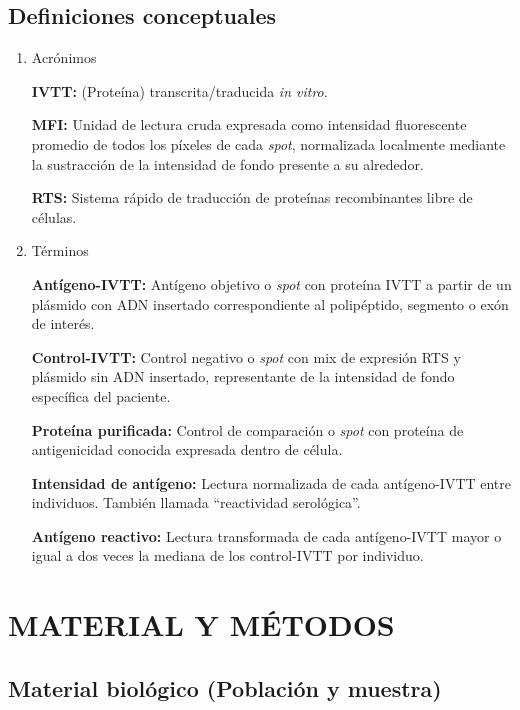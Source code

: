 \documentclass[
  a4paper]{article}
\begin{document}
\hypertarget{definiciones-conceptuales}{%
\subsection{Definiciones conceptuales}\label{definiciones-conceptuales}}

\begin{enumerate}
\def\labelenumi{\alph{enumi}.}
\item
  Acrónimos

  \textbf{IVTT:} (Proteína) transcrita/traducida \emph{in vitro}.

  \textbf{MFI:} Unidad de lectura cruda expresada como intensidad
  fluorescente promedio de todos los píxeles de cada \emph{spot},
  normalizada localmente mediante la sustracción de la intensidad de
  fondo presente a su alrededor.

  \textbf{RTS:} Sistema rápido de traducción de proteínas recombinantes
  libre de células.
\item
  Términos

  \textbf{Antígeno-IVTT:} Antígeno objetivo o \emph{spot} con proteína
  IVTT a partir de un plásmido con ADN insertado correspondiente al
  polipéptido, segmento o exón de interés.

  \textbf{Control-IVTT:} Control negativo o \emph{spot} con mix de
  expresión RTS y plásmido sin ADN insertado, representante de la
  intensidad de fondo específica del paciente.

  \textbf{Proteína purificada:} Control de comparación o \emph{spot} con
  proteína de antigenicidad conocida expresada dentro de célula.

  \textbf{Intensidad de antígeno:} Lectura normalizada de cada
  antígeno-IVTT entre individuos. También llamada ``reactividad
  serológica''.

  \textbf{Antígeno reactivo:} Lectura transformada de cada antígeno-IVTT
  mayor o igual a dos veces la mediana de los control-IVTT por
  individuo.
\end{enumerate}

\hypertarget{meto}{%
\section{MATERIAL Y MÉTODOS}\label{meto}}

\hypertarget{material-bioluxf3gico-poblaciuxf3n-y-muestra}{%
\subsection{Material biológico (Población y
muestra)}\label{material-bioluxf3gico-poblaciuxf3n-y-muestra}}
\end{document}
